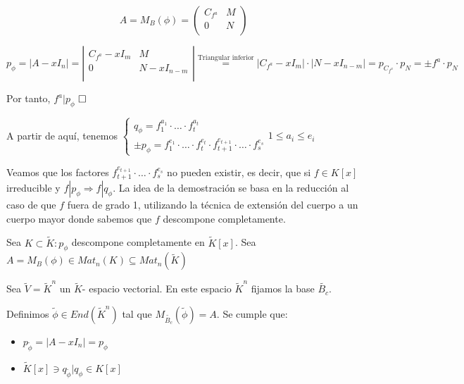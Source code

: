 \documentclass[10pt,a4paper,openright]{book}
\begin{document}
$$A = M_B (\phi) = \left(\begin{array}{c|c}
C_{f^a} & M \\
\hline
0 & N   \\
\end{array}
\right)$$

$p_\phi = |A - xI_n| = \left|\begin{array}{c|c}
C_{f^a} - xI_m & M \\
\hline
0 & N - xI_{n-m}  \\
\end{array}
\right| \overset{\mbox{Triangular inferior}}{=} |C_{f^a} - xI_m| \cdot |N - xI_{n-m}| = p_{C_{f^a}} \cdot p_N = \pm f^a \cdot p_N$

Por tanto, $f^a | p_\phi$
$\hfill\square$

A partir de aquí, tenemos
$\begin{cases} q_\phi = f^{a_1}_1 \cdot \ldots \cdot f^{a_t}_t \\
\pm p_\phi =  f^{e_1}_1 \cdot \ldots \cdot f^{e_t}_t \cdot f^{e_{t+1}}_{t+1} \cdot \ldots \cdot f^{e_s}_s  \end{cases} 1  \leq a_i \leq e_i$

Veamos que los factores $f^{e_{t+1}}_{t+1} \cdot \ldots \cdot f^{e_s}_s $ no pueden existir, es decir, que si $f \in K[x]$ irreducible y $f | p_\phi \Rightarrow f | q_\phi$. La idea de la demostración se basa en la reducción al caso de que $f$ fuera de grado 1, utilizando la técnica de extensión del cuerpo a un cuerpo mayor donde sabemos que $f$ descompone completamente.

Sea $K \subset \tilde{K} : p_\phi $ descompone completamente en $\tilde{K}[x]$. Sea $A = M_B (\phi) \in Mat_n(K) \subseteq Mat_n(\tilde{K})$

Sea $\tilde{V} = \tilde{K}^n$ un $\tilde{K}$- espacio vectorial. En este espacio $\tilde{K}^n$ fijamos la base $\tilde{B_c}$.

Definimos $\tilde{\phi} \in End(\tilde{K}^n)$ tal que $M_{\tilde{B_c}}(\tilde{\phi}) = A$. Se cumple que:
\begin{itemize}
\item $p_{\tilde{\phi}} = |A - xI_n| = p_\phi$

\item $\tilde{K}[x] \ni q_{\tilde{\phi}} | q_\phi \in K[x]$
\end{itemize}
\end{document}
